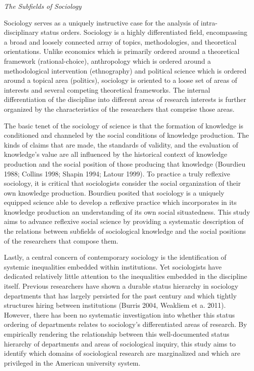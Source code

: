 \documentclass{article}
\begin{document}
\emph{The Subfields of Sociology}

Sociology serves as a uniquely instructive case for the analysis of
intra-disciplinary status orders. Sociology is a highly differentiated
field, encompassing a broad and loosely connected array of topics,
methodologies, and theoretical orientations. Unlike economics which is
primarily ordered around a theoretical framework (rational-choice),
anthropology which is ordered around a methodological intervention
(ethnography) and political science which is ordered around a topical
area (politics), sociology is oriented to a loose set of areas of
interests and several competing theoretical frameworks. The internal
differentiation of the discipline into different areas of research
interests is further organized by the characteristics of the researchers
that comprise those areas.

The basic tenet of the sociology of science is that the formation of
knowledge is conditioned and channeled by the social conditions of
knowledge production. The kinds of claims that are made, the standards
of validity, and the evaluation of knowledge's value are all influenced
by the historical context of knowledge production and the social
position of those producing that knowledge (Bourdieu 1988; Collins 1998;
Shapin 1994; Latour 1999). To practice a truly reflexive sociology, it
is critical that sociologists consider the social organization of their
own knowledge production. Bourdieu posited that sociology is a uniquely
equipped science able to develop a reflexive practice which incorporates
in its knowledge production an understanding of its own social
situatedness. This study aims to advance reflexive social science by
providing a systematic description of the relations between subfields of
sociological knowledge and the social positions of the researchers that
compose them.

Lastly, a central concern of contemporary sociology is the
identification of systemic inequalities embedded within institutions.
Yet sociologists have dedicated relatively little attention to the
inequalities embedded in the discipline itself. Previous researchers
have shown a durable status hierarchy in sociology departments that has
largely persisted for the past century and which tightly structures
hiring between institutions (Burris 2004, Weakliem et a. 2011). However,
there has been no systematic investigation into whether this status
ordering of departments relates to sociology's differentiated areas of
research. By empirically rendering the relationship between this
well-documented status hierarchy of departments and areas of
sociological inquiry, this study aims to identify which domains of
sociological research are marginalized and which are privileged in the
American university system.
\end{document}
